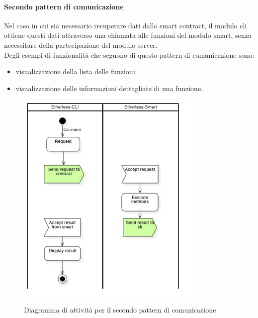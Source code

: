 	\paragraph{Secondo pattern di comunicazione}
		Nel caso in cui sia necessario recuperare dati dallo smart contract, il modulo cli ottiene questi dati attraverso una chiamata alle funzioni del modulo smart, senza necessitare della partecipazione del modulo server.\\  Degli esempi di funzionalità che seguono di questo pattern di comunicazione sono:
		\begin{itemize}
			\item visualizzazione della lista delle funzioni;
			\item visualizzazione delle informazioni dettagliate di una funzione.
		\end{itemize}
	\begin{figure}[H]
		\centering
		\includegraphics[width=0.8\textwidth]{././diagrammi/generali/activity_diag_pattern1.jpg}
		\caption{Diagramma di attività per il secondo pattern di comunicazione}
	\end{figure}
